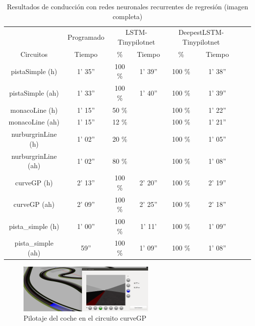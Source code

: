 \begin{table}[H]
\centering
\caption{Resultados de conducción con redes neuronales recurrentes de regresión (imagen completa)}
\label{resultados_regresion_recurrente_completa}
\begin{tabular}{c|c|c|c|c|c|c|c|}
\cline{2-6}
                          & \multicolumn{1}{c|}{Programado} & \multicolumn{2}{c|}{LSTM-Tinypilotnet} & \multicolumn{2}{c|}{DeepestLSTM-Tinypilotnet} \\ \cline{1-6} 
                        \multicolumn{1}{|c|}{Circuitos}    & Tiempo       & \%       & Tiempo       & \%        & Tiempo      \\ \hline
\multicolumn{1}{|c|}{pistaSimple (h)}    & 1' 35''     & 100 \%  & 1' 39''    & 100 \%  & 1' 38''         \\ \hline
\multicolumn{1}{|c|}{pistaSimple (ah)}     & 1' 33''   & 100 \%        & 1' 40''        & 100 \%     & 1' 39''   \\ \hline
\multicolumn{1}{|c|}{monacoLine (h)}      & 1' 15''      & 50 \%        &        & 100 \%       & 1' 22''           \\ \hline
\multicolumn{1}{|c|}{monacoLine (ah)}       & 1' 15''       & 12 \%       &         & 100 \%          & 1' 21''        \\ \hline
\multicolumn{1}{|c|}{nurburgrinLine (h)}      & 1' 02''       & 20 \%     &       & 100 \%     & 1' 05''       \\ \hline
\multicolumn{1}{|c|}{nurburgrinLine (ah)}       & 1' 02''     & 80 \%     &        & 100 \%     & 1' 08''         \\ \hline
\multicolumn{1}{|c|}{curveGP (h)}     & 2' 13''     & 100 \%     & 2' 20''     & 100 \%      & 2' 19''             \\ \hline
\multicolumn{1}{|c|}{curveGP (ah)}       & 2' 09''       & 100 \%    & 2' 25''     & 100 \%       & 2' 18''      \\ \hline
\multicolumn{1}{|c|}{pista\_simple (h)}       & 1' 00''    & 100 \%      & 1' 11'      & 100 \%      & 1' 09''    \\ \hline
\multicolumn{1}{|c|}{pista\_simple (ah)}     & 59''    & 100 \%    & 1' 09''    &  100 \%      & 1' 08''          \\ \hline
\end{tabular}
\end{table}


\begin{figure}[H]
\begin{center}
	\includegraphics[width=0.6\textwidth]{figures/Regresion/deep_curve.png}
   \caption{Pilotaje del coche en el circuito curveGP}
	\label{fig.curve_reg}
\end{center}
\end{figure}

